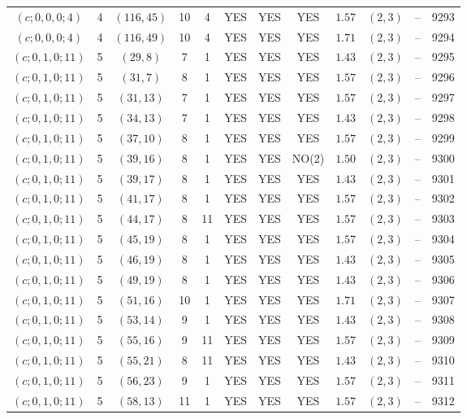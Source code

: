 \begin{longtable}{|c|c|c|c|c|c|c|c|c|c|c|c|}
$(c;0,0,0;4)$ & 4 & $(116,45)$ & 10 & 4 & YES & YES & YES & $1.57$ & $(2,3)$ & -- & 9293\\
$(c;0,0,0;4)$ & 4 & $(116,49)$ & 10 & 4 & YES & YES & YES & $1.71$ & $(2,3)$ & -- & 9294\\
$(c;0,1,0;11)$ & 5 & $(29,8)$ & 7 & 1 & YES & YES & YES & $1.43$ & $(2,3)$ & -- & 9295\\
$(c;0,1,0;11)$ & 5 & $(31,7)$ & 8 & 1 & YES & YES & YES & $1.57$ & $(2,3)$ & -- & 9296\\
$(c;0,1,0;11)$ & 5 & $(31,13)$ & 7 & 1 & YES & YES & YES & $1.57$ & $(2,3)$ & -- & 9297\\
$(c;0,1,0;11)$ & 5 & $(34,13)$ & 7 & 1 & YES & YES & YES & $1.43$ & $(2,3)$ & -- & 9298\\
$(c;0,1,0;11)$ & 5 & $(37,10)$ & 8 & 1 & YES & YES & YES & $1.57$ & $(2,3)$ & -- & 9299\\
$(c;0,1,0;11)$ & 5 & $(39,16)$ & 8 & 1 & YES & YES & NO(2) & $1.50$ & $(2,3)$ & -- & 9300\\
$(c;0,1,0;11)$ & 5 & $(39,17)$ & 8 & 1 & YES & YES & YES & $1.43$ & $(2,3)$ & -- & 9301\\
$(c;0,1,0;11)$ & 5 & $(41,17)$ & 8 & 1 & YES & YES & YES & $1.57$ & $(2,3)$ & -- & 9302\\
$(c;0,1,0;11)$ & 5 & $(44,17)$ & 8 & 11 & YES & YES & YES & $1.57$ & $(2,3)$ & -- & 9303\\
$(c;0,1,0;11)$ & 5 & $(45,19)$ & 8 & 1 & YES & YES & YES & $1.57$ & $(2,3)$ & -- & 9304\\
$(c;0,1,0;11)$ & 5 & $(46,19)$ & 8 & 1 & YES & YES & YES & $1.43$ & $(2,3)$ & -- & 9305\\
$(c;0,1,0;11)$ & 5 & $(49,19)$ & 8 & 1 & YES & YES & YES & $1.43$ & $(2,3)$ & -- & 9306\\
$(c;0,1,0;11)$ & 5 & $(51,16)$ & 10 & 1 & YES & YES & YES & $1.71$ & $(2,3)$ & -- & 9307\\
$(c;0,1,0;11)$ & 5 & $(53,14)$ & 9 & 1 & YES & YES & YES & $1.43$ & $(2,3)$ & -- & 9308\\
$(c;0,1,0;11)$ & 5 & $(55,16)$ & 9 & 11 & YES & YES & YES & $1.57$ & $(2,3)$ & -- & 9309\\
$(c;0,1,0;11)$ & 5 & $(55,21)$ & 8 & 11 & YES & YES & YES & $1.43$ & $(2,3)$ & -- & 9310\\
$(c;0,1,0;11)$ & 5 & $(56,23)$ & 9 & 1 & YES & YES & YES & $1.57$ & $(2,3)$ & -- & 9311\\
$(c;0,1,0;11)$ & 5 & $(58,13)$ & 11 & 1 & YES & YES & YES & $1.57$ & $(2,3)$ & -- & 9312\\

\end{longtable}
